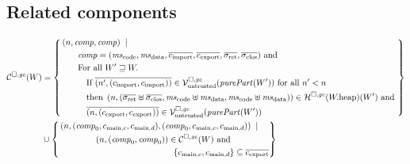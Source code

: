 \documentclass[a4paper]{article}
\begin{document}
\subsection{Related components}
\label{sec:related-components}

\begin{align*}
  \lrcomp(W) &=
  \left\{\begin{aligned}
     &\npair{\var{comp},\var{comp}} \;\mid \;\\
      &\qquad\var{comp} = (\mscode,\msdata,\overline{c_{\mathrm{import}}},\overline{c_{\mathrm{export}}},\sigrets,\sigcloss) \tand \\
      &\qquad\text{For all } W' \future W \ldotp \\
      &\qquad\quad\text{If } \overline{\npair[n']{(c_{\mathrm{import}},c_{\mathrm{import}})}} \in \lrv(\purePart{W'}) \text{ for all $n' < n$}\\
      &\qquad\quad\text{then } \npair{(\sigrets\uplus\sigcloss,\mscode\uplus \msdata, \mscode\uplus\msdata)} \in \lrheap(\pwheap)(W') \tand\\
      &\qquad\quad\overline{\npair{(c_{\mathrm{export}},c_{\mathrm{export}})}} \in \lrv(\purePart{W'})
  \end{aligned}
    \right\}\\
  &\cup \left\{
    \begin{multlined}
     \npair{(\var{comp}_0,c_{\mathrm{main},c}, c_{\mathrm{main},d}),(\var{comp}_0,c_{\mathrm{main},c}, c_{\mathrm{main},d})} \;\mid \;\\
     \npair{(\var{comp}_0,\var{comp}_0)} \in \lrcomp(W) \tand\\
     \{c_{\mathrm{main},c},c_{\mathrm{main},d}\} \subseteq \overline{c_{\mathrm{export}}}
       \end{multlined}
    \right\} 
\end{align*}
\end{document}
